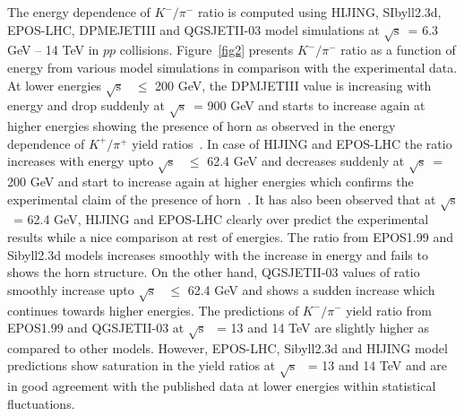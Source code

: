 \documentclass{article}
\newcommand{\sqrts}{\mbox{$\sqrt{\mathrm{s}}$}}
\begin{document}
The energy dependence of $K^-/\pi^-$ ratio is computed using HIJING, SIbyll2.3d, EPOS-LHC, DPMEJETIII and QGSJETII-03 model simulations at \sqrts~= 6.3 GeV -- 14 TeV in $pp$ collisions. %
Figure~\ref{fig2} presents $K^-/\pi^-$ ratio as a function of energy from various model simulations in comparison with the experimental data. At lower energies \sqrts~ $\le$ 200 GeV, the DPMJETIII value is increasing with energy and drop suddenly at \sqrts~= 900 GeV and starts to increase again at higher energies showing the presence of horn as observed in the energy dependence of $K^+/\pi^+$ yield ratios~\cite{Bhattacharyya:2017rmc}. In case of HIJING and EPOS-LHC the ratio increases with energy upto \sqrts~ $\le$ 62.4 GeV and decreases suddenly at \sqrts~= 200 GeV and start to increase again at higher energies which confirms the experimental claim of the presence of horn~\cite{NA49:2002pzu, NA49:2007stj, Pulawski:2015tka}. It has also been observed that at \sqrts~= 62.4 GeV, HIJING and EPOS-LHC clearly over predict the experimental results while a nice comparison at rest of energies. The ratio from EPOS1.99 and Sibyll2.3d models increases smoothly with the increase in energy and fails to shows the horn structure. On the other hand, QGSJETII-03 values of ratio smoothly increase upto \sqrts~ $\le$ 62.4 GeV and shows a sudden increase which continues towards higher energies. The predictions of $K^-/\pi^-$ yield ratio from EPOS1.99 and QGSJETII-03 at \sqrts~ = 13 and 14 TeV are slightly higher as compared to other models. However, EPOS-LHC, Sibyll2.3d and HIJING model predictions show saturation in the yield ratios at \sqrts~ = 13 and 14 TeV and are in good agreement with the published data at lower energies within statistical fluctuations. 
\end{document}
